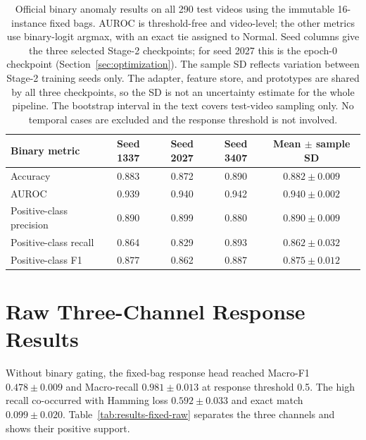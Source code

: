 \begin{table}[tbp]
    \centering
    \small
    \caption[Official fixed-bag binary test results.]{Official binary anomaly results on all 290 test videos using the immutable 16-instance fixed bags. AUROC is threshold-free and video-level; the other metrics use binary-logit argmax, with an exact tie assigned to Normal. Seed columns give the three selected Stage-2 checkpoints; for seed 2027 this is the epoch-0 checkpoint (Section~\ref{sec:optimization}). The sample SD reflects variation between Stage-2 training seeds only. The adapter, feature store, and prototypes are shared by all three checkpoints, so the SD is not an uncertainty estimate for the whole pipeline. The bootstrap interval in the text covers test-video sampling only. No temporal cases are excluded and the response threshold is not involved.}
    \label{tab:results-fixed-binary}
    \begin{tabular}{@{}lcccc@{}}
        \toprule
        \textbf{Binary metric} & \textbf{Seed 1337} & \textbf{Seed 2027} & \textbf{Seed 3407} & \textbf{Mean $\pm$ sample SD} \\
        \midrule
        Accuracy & 0.883 & 0.872 & 0.890 & $0.882 \pm 0.009$ \\
        AUROC & 0.939 & 0.940 & 0.942 & $0.940 \pm 0.002$ \\
        Positive-class precision & 0.890 & 0.899 & 0.880 & $0.890 \pm 0.009$ \\
        Positive-class recall & 0.864 & 0.829 & 0.893 & $0.862 \pm 0.032$ \\
        Positive-class F1 & 0.877 & 0.862 & 0.887 & $0.875 \pm 0.012$ \\
        \bottomrule
    \end{tabular}
\end{table}

\section{Raw Three-Channel Response Results}
\label{sec:results-fixed-raw}

Without binary gating, the fixed-bag response head reached Macro-F1 $0.478 \pm 0.009$ and Macro-recall $0.981 \pm 0.013$ at response threshold 0.5. The high recall co-occurred with Hamming loss $0.592 \pm 0.033$ and exact match $0.099 \pm 0.020$. Table~\ref{tab:results-fixed-raw} separates the three channels and shows their positive support.

